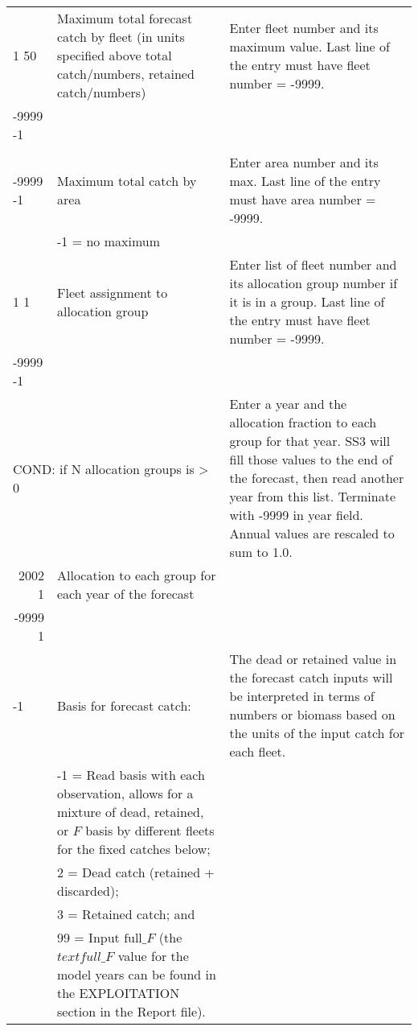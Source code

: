 \begin{landscape}
{\begin{longtable}{p{2cm} p{7cm} p{12cm}}
  \hline
  1 50 & \multirow{1}{1cm}[-0.25cm]{\parbox{7cm}{Maximum total forecast catch by fleet (in units specified above total catch/numbers, retained catch/numbers)}} & \multirow{1}{1cm}[-0.25cm]{\parbox{12cm}{Enter fleet number and its maximum value. Last line of the entry must have fleet number = -9999.}} \Tstrut\Bstrut\\
  -9999 -1 & & \Bstrut\\
   & & \\
  \hline

  -9999 -1 & Maximum total catch by area & \multirow{1}{1cm}[-0.25cm]{\parbox{12cm}{Enter area number and its max. Last line of the entry must have area number = -9999.}} \Tstrut\\
    & -1 = no maximum & \Bstrut\\

  \hline
  1 1 & Fleet assignment to allocation group & \multirow{1}{1cm}[-0.25cm]{\parbox{12cm}{Enter list of fleet number and its allocation group number if it is in a group. Last line of the entry must have fleet number = -9999.}} \Tstrut\\
  -9999 -1 & & \\ 

  \multicolumn{2}{l}{COND: if N allocation groups is > 0} & \multirow{1}{1cm}[-0.25cm]{\parbox{12cm}{Enter a year and the allocation fraction to each group for that year. SS3 will fill those values to the end of the forecast, then read another year from this list. Terminate with -9999 in year field. Annual values are rescaled to sum to 1.0.}} \\
  \multicolumn{1}{r}{2002 1} & Allocation to each group for each year of the forecast & \\
  \multicolumn{1}{r}{-9999 1} & & \Bstrut\\

  \hline
  -1 & Basis for forecast catch: & \multirow{1}{1cm}[-0.25cm]{\parbox{12cm}{The dead or retained value in the forecast catch inputs will be interpreted in terms of numbers or biomass based on the units of the input catch for each fleet.}} \Tstrut\\
    & -1 = Read basis with each observation, allows for a mixture of dead, retained, or $F$ basis by different fleets for the fixed catches below; & \\
    & 2 = Dead catch (retained + discarded); & \\
    & 3 = Retained catch; and & \\
    & 99 = Input $\text{full\_}F$ (the $text{full\_}F$ value for the model years can be found in the EXPLOITATION section in the Report file). & \Bstrut\\
  

\end{longtable}}
\end{landscape}
